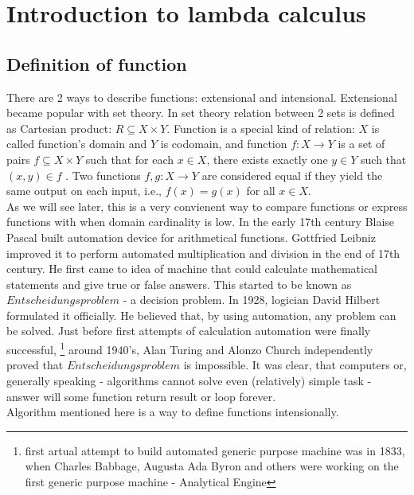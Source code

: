 


\chapter{Introduction to lambda calculus}

\section{Definition of function}

There are 2 ways to describe functions: extensional and intensional. Extensional became popular with set theory. 
In set theory relation between 2 sets is defined as Cartesian product: $R \subseteq X \times Y$. Function
is a special kind of relation:
$X$ is called function's domain and $Y$ is codomain, and function $f : X \rightarrow Y$ 
is a set of pairs $f \subseteq X \times Y$ such that for each $x \in X$, there exists exactly one 
$y \in Y$ such that $(x, y) \in f$ . Two functions $f, g : X \rightarrow Y$ are
considered equal if they yield the same output on each input, i.e., $f(x) = g(x)$ for all $x \in X$.
\\
As we will see later, this is a very convienent way to compare functions or express functions with when domain cardinality is low.
In the early 17th century Blaise Pascal built automation device for arithmetical functions. Gottfried Leibniz improved it
to perform automated multiplication and division in the end of 17th century. He first came to idea of machine that could 
calculate mathematical statements and give true or false answers. This started to be known as $Entscheidungsproblem$ - a decision
problem. In 1928, logician David Hilbert formulated it officially. He believed that, by using automation, any problem can be solved.
Just before first attempts of calculation automation were finally successful,
\footnote{first artual attempt to build automated generic purpose machine was in 1833, when Charles Babbage, Augusta Ada Byron and 
others were working on the first generic purpose machine - Analytical Engine}
around 1940's, Alan Turing and Alonzo Church independently proved that $Entscheidungsproblem$ is impossible. It was clear, that
computers or, generally speaking - algorithms cannot solve even (relatively) simple task - answer will some function return result
or loop forever.
\\
Algorithm mentioned here is a way to define functions intensionally.

